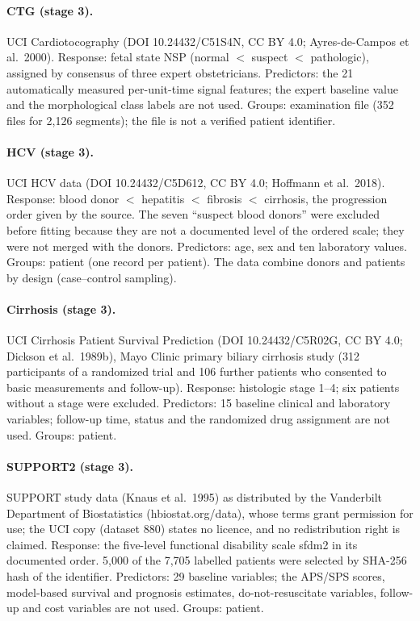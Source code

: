 \documentclass[10pt]{article}
\begin{document}
\paragraph{CTG (stage 3).} UCI Cardiotocography (DOI 10.24432/C51S4N, CC BY 4.0; Ayres-de-Campos et al.\ 2000). Response: fetal state NSP (normal $<$ suspect $<$ pathologic), assigned by consensus of three expert obstetricians. Predictors: the 21 automatically measured per-unit-time signal features; the expert baseline value and the morphological class labels are not used. Groups: examination file (352 files for 2,126 segments); the file is not a verified patient identifier.

\paragraph{HCV (stage 3).} UCI HCV data (DOI 10.24432/C5D612, CC BY 4.0; Hoffmann et al.\ 2018). Response: blood donor $<$ hepatitis $<$ fibrosis $<$ cirrhosis, the progression order given by the source. The seven ``suspect blood donors'' were excluded before fitting because they are not a documented level of the ordered scale; they were not merged with the donors. Predictors: age, sex and ten laboratory values. Groups: patient (one record per patient). The data combine donors and patients by design (case--control sampling).

\paragraph{Cirrhosis (stage 3).} UCI Cirrhosis Patient Survival Prediction (DOI 10.24432/C5R02G, CC BY 4.0; Dickson et al.\ 1989b), Mayo Clinic primary biliary cirrhosis study (312 participants of a randomized trial and 106 further patients who consented to basic measurements and follow-up). Response: histologic stage 1--4; six patients without a stage were excluded. Predictors: 15 baseline clinical and laboratory variables; follow-up time, status and the randomized drug assignment are not used. Groups: patient.

\paragraph{SUPPORT2 (stage 3).} SUPPORT study data (Knaus et al.\ 1995) as distributed by the Vanderbilt Department of Biostatistics (hbiostat.org/data), whose terms grant permission for use; the UCI copy (dataset 880) states no licence, and no redistribution right is claimed. Response: the five-level functional disability scale sfdm2 in its documented order. 5,000 of the 7,705 labelled patients were selected by SHA-256 hash of the identifier. Predictors: 29 baseline variables; the APS/SPS scores, model-based survival and prognosis estimates, do-not-resuscitate variables, follow-up and cost variables are not used. Groups: patient.
\end{document}
